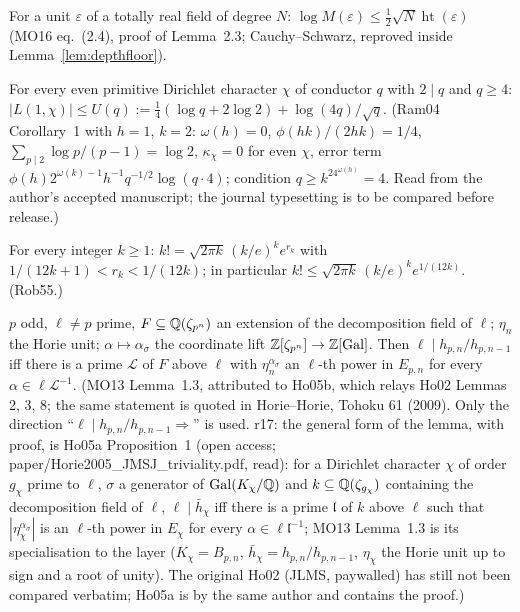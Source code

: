 \begin{lemma}\label{lem:mo24}
For a unit $\varepsilon$ of a totally real field of degree $N$: $\log M(\varepsilon)\le\tfrac12\sqrt N\operatorname{ht}(\varepsilon)$ (MO16 eq.~(2.4), proof of Lemma~2.3; Cauchy--Schwarz, reproved inside Lemma~\ref{lem:depthfloor}).
\end{lemma}
\begin{lemma}\label{lem:ramare}
For every even primitive Dirichlet character $\chi$ of conductor $q$ with $2\mid q$ and $q\ge4$: $|L(1,\chi)|\le U(q):=\frac14(\log q+2\log2)+\log(4q)/\sqrt q$. (Ram04 Corollary~1 with $h=1$, $k=2$: $\omega(h)=0$, $\phi(hk)/(2hk)=1/4$, $\sum_{p\mid 2}\log p/(p-1)=\log2$, $\kappa_\chi=0$ for even $\chi$, error term $\phi(h)2^{\omega(k)-1}h^{-1}q^{-1/2}\log(q\cdot4)$; condition $q\ge k^24^{\omega(h)}=4$. Read from the author's accepted manuscript; the journal typesetting is to be compared before release.)
\end{lemma}
\begin{lemma}\label{lem:robbins}
For every integer $k\ge1$: $k!=\sqrt{2\pi k}\,(k/e)^k e^{r_k}$ with $1/(12k+1)<r_k<1/(12k)$; in particular $k!\le\sqrt{2\pi k}\,(k/e)^ke^{1/(12k)}$. (Rob55.)
\end{lemma}
\begin{lemma}\label{lem:horie13}
$p$ odd, $\ell\ne p$ prime, $F\subseteq\mathbb{Q}(\zeta_{p^n})$ an extension of the decomposition field of $\ell$; $\eta_n$ the Horie unit; $\alpha\mapsto\alpha_\sigma$ the coordinate lift $\mathbb{Z}[\zeta_{p^n}]\to\mathbb{Z}[\operatorname{Gal}]$. Then $\ell\mid h_{p,n}/h_{p,n-1}$ iff there is a prime $\mathcal L$ of $F$ above $\ell$ with $\eta_n^{\alpha_\sigma}$ an $\ell$-th power in $E_{p,n}$ for every $\alpha\in\ell\mathcal L^{-1}$. (MO13 Lemma~1.3, attributed to Ho05b, which relays Ho02 Lemmas 2, 3, 8; the same statement is quoted in Horie--Horie, Tohoku 61 (2009). Only the direction ``$\ell\mid h_{p,n}/h_{p,n-1}\Rightarrow$'' is used. r17: the general form of the lemma, with proof, is Ho05a Proposition~1 (open access; paper/Horie2005\_JMSJ\_triviality.pdf, read): for a Dirichlet character $\chi$ of order $g_\chi$ prime to $\ell$, $\sigma$ a generator of $\operatorname{Gal}(K_\chi/\mathbb{Q})$ and $k\subseteq\mathbb{Q}(\zeta_{g_\chi})$ containing the decomposition field of $\ell$, $\ell\mid\bar h_\chi$ iff there is a prime $\mathfrak l$ of $k$ above $\ell$ such that $|\eta_\chi^{\alpha_\sigma}|$ is an $\ell$-th power in $E_\chi$ for every $\alpha\in\ell\mathfrak l^{-1}$; MO13 Lemma~1.3 is its specialisation to the layer ($K_\chi=B_{p,n}$, $\bar h_\chi=h_{p,n}/h_{p,n-1}$, $\eta_\chi$ the Horie unit up to sign and a root of unity). The original Ho02 (JLMS, paywalled) has still not been compared verbatim; Ho05a is by the same author and contains the proof.)
\end{lemma}
